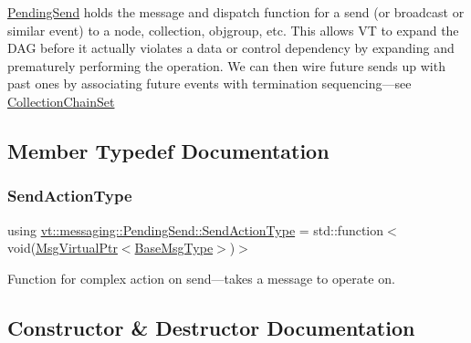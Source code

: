 {\ttfamily \hyperlink{structvt_1_1messaging_1_1_pending_send}{Pending\+Send}} holds the message and dispatch function for a send (or broadcast or similar event) to a node, collection, objgroup, etc. This allows VT to expand the D\+AG before it actually violates a data or control dependency by expanding and prematurely performing the operation. We can then wire future sends up with past ones by associating future events with termination sequencing---see {\ttfamily \hyperlink{classvt_1_1messaging_1_1_collection_chain_set}{Collection\+Chain\+Set}} 

\subsection{Member Typedef Documentation}
\mbox{\label{structvt_1_1messaging_1_1_pending_send_a758cf5a064cb5198b47e979c891fecd6}} 
\subsubsection{\texorpdfstring{Send\+Action\+Type}{SendActionType}}
{\footnotesize\ttfamily using \hyperlink{structvt_1_1messaging_1_1_pending_send_a758cf5a064cb5198b47e979c891fecd6}{vt\+::messaging\+::\+Pending\+Send\+::\+Send\+Action\+Type} =  std\+::function$<$void(\hyperlink{namespacevt_a82b5c92ea7ca3ddd2e8a2e27df87fa1a}{Msg\+Virtual\+Ptr}$<$\hyperlink{namespacevt_a44d0d4e144748f2b19a1cfd962f50338}{Base\+Msg\+Type}$>$)$>$}



Function for complex action on send---takes a message to operate on. 



\subsection{Constructor \& Destructor Documentation}
\mbox{\label{structvt_1_1messaging_1_1_pending_send_a026f0aed2099e7e1017aee5bd62ea9cd}} 
